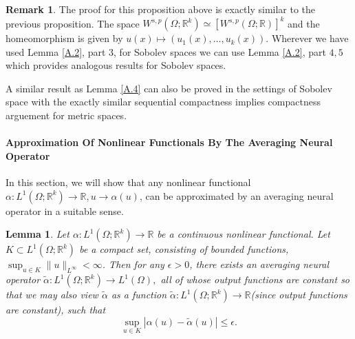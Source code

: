 \documentclass[reqno]{amsart}
\theoremstyle{plain}
\newtheorem{lem}{Lemma}
\theoremstyle{definition}
\newtheorem{rem}{Remark}
\newcommand{\bb}[1]{\mathbb{#1}}
\begin{document}
\begin{rem}
    The proof for this proposition above is exactly similar to the previous proposition. The space $W^{s,p}(\Omega;\bb R^k) \simeq [W^{s,p}(\Omega; \bb R)]^k$ and the homeomorphism is given by $u(x) \mapsto (u_1(x),\dots,u_k(x))$. Wherever we have used Lemma \ref{A.2}, part $3$, for Sobolev spaces we can use Lemma \ref{A.2}, part $4,5$ which provides analogous results for Sobolev spaces.

    \noindent A similar result as Lemma \ref{A.4} can also be proved in the settings of Sobolev space with the exactly similar sequential compactness implies compactness arguement for metric spaces.
\end{rem}
\paragraph{\bf Approximation Of Nonlinear Functionals By The Averaging Neural Operator}
In this section, we will show that any nonlinear functional $\alpha: L^1(\Omega; \bb R^k) \to \bb R, u \to \alpha(u)$, can be approximated by an averaging neural operator in a suitable sense.
\begin{lem}\label{A.9}
    Let $\alpha:L^1(\Omega;\bb R^k) \to \bb R$ be a continuous nonlinear functional. Let $K \subset L^1(\Omega; \bb R^k)$ be a compact set, consisting of bounded functions, $\sup_{u \in K} \|u\|_{L^\infty} < \infty$. Then for any $\epsilon > 0$, there exists an averaging neural operator $\tilde{\alpha} : L^1(\Omega; \bb R^k) \to L^1(\Omega),$ all of whose output functions are constant so that we may also view $\tilde{\alpha}$ as a function $\tilde{\alpha} : L^1(\Omega; \bb R^k) \to \bb R$(since output functions are constant), such that
    $$ \sup\limits_{u \in K} |\alpha(u) - \tilde{\alpha}(u)| \leq \epsilon.$$
\end{lem}
\end{document}
